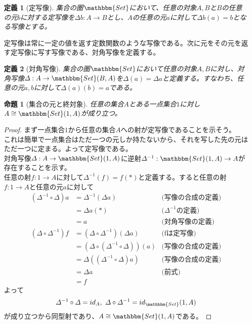 \documentclass[uplatex,dvipdfmx]{jsarticle}
\newcommand{\cat}[1]{\mathbbm{#1}}
\newcommand{\arrow}{\rightarrow}
\newcommand{\mor}[3]{#1:#2\arrow #3}
\newcommand{\arset}[3]{\cat{#1}(#2,#3)}
\newtheorem{proof}{証明}[section]
\newtheorem{prop}{命題}[section]
\newtheorem{define}{定義}[section]
\numberwithin{proof}{subsection}
\numberwithin{prop}{subsection}
\numberwithin{define}{subsection}
\begin{document}
  \begin{define}[定写像]
    集合の圏$\cat{Set}$において、任意の対象$A,B$と$B$の任意の元$b$に対する定写像を$\mor{\varDelta b}{A}{B}$とし、$A$の任意の元$a$に対して$\varDelta b(a)=b$となる写像とする。
  \end{define}
  定写像は常に一定の値を返す定数関数のような写像である。次に元をその元を返す定写像に写す写像である、対角写像を定義する。
  \begin{define}[対角写像]
    集合の圏$\cat{Set}$において任意の対象$A,B$に対し、対角写像$\mor{\varDelta}{A}{\arset{Set}{B}{A}}$を$\varDelta(a)=\varDelta a$と定義する。すなわち、任意の元$a,b$に対して$\varDelta(a)(b)=a$である。
  \end{define}
	\begin{prop}[集合の元と終対象]
		任意の集合$A$とある一点集合$1$に対し$A\cong\arset{Set}{1}{A}$が成り立つ。
	\end{prop}
	\begin{proof}
    まず一点集合$1$から任意の集合$A$への射が定写像であることを示そう。\\
    これは簡単で一点集合はただ一つの元しか持たないから、それを写した先の元はただ一つに定まる。よって定写像である。\\
    対角写像$\mor{\varDelta}{A}{\arset{Set}{1}{A}}$に逆射$\mor{\varDelta^{-1}}{\arset{Set}{1}{A}}{A}$が存在することを示す。\\
    任意の射$\mor{f}{1}{A}$に対して$\varDelta^{-1}(f)=f(*)$と定義する。すると任意の射$\mor{f}{1}{A}$と任意の元$a$に対して
    \begin{align*}
      (\varDelta^{-1}\circ\varDelta)a&=\varDelta^{-1}(\varDelta a)&\text{(写像の合成の定義)}\\
      &=\varDelta a(*)&\text{($\varDelta^{-1}$の定義)}\\
      &=a&\text{(対角写像の定義)}\\
      (\varDelta\circ\varDelta^{-1})f&=(\varDelta\circ\varDelta^{-1})(\varDelta a)&\text{(fは定写像)}\\
      &=(\varDelta\circ(\varDelta^{-1}\circ\varDelta))(a)&\text{(写像の合成の定義)}\\
      &=\varDelta((\varDelta^{-1}\circ\varDelta)a)&\text{(写像の合成の定義)}\\
      &=\varDelta a&\text{(前式)}\\
      &=f
    \end{align*}
    よって\[\varDelta^{-1}\circ\varDelta=id_A,\ \varDelta\circ\varDelta^{-1}=id_\arset{Set}{1}{A}\]が成り立つから同型射であり、$A\cong\arset{Set}{1}{A}$である。
	\end{proof}
\end{document}
